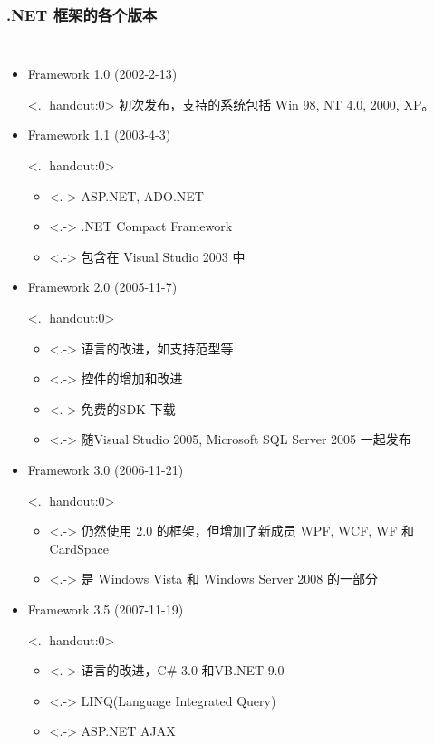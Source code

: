 \begin{frame}
\frametitle{.NET 框架的各个版本}

\begin{columns}[t]
\begin{itemize}[<+->]
\small
\item Framework 1.0 (2002-2-13)

\only<.| handout:0>{ \CJKindent 初次发布，支持的系统包括 Win 98, NT 4.0, 2000, XP。}

\item Framework 1.1 (2003-4-3)

\only<.| handout:0>{
\begin{itemize}
\item<.-> ASP.NET, ADO.NET
\item<.-> .NET Compact Framework
\item<.-> 包含在 Visual Studio 2003 中
\end{itemize}}

\item Framework 2.0 (2005-11-7)

\only<.| handout:0>{
\begin{itemize}
\item<.-> 语言的改进，如支持范型等
\item<.-> 控件的增加和改进
\item<.-> 免费的SDK 下载
\item<.-> 随Visual Studio 2005, Microsoft SQL Server 2005 一起发布
\end{itemize}}

\item Framework 3.0 (2006-11-21)

\only<.| handout:0>{
\begin{itemize}
\item<.-> 仍然使用 2.0 的框架，但增加了新成员 WPF, WCF, WF 和 CardSpace
\item<.-> 是 Windows Vista 和 Windows Server 2008 的一部分
\end{itemize}}

\item Framework 3.5 (2007-11-19)

\only<.| handout:0>{
\begin{itemize}
\item<.-> 语言的改进，C\# 3.0 和VB.NET 9.0
\item<.-> LINQ(Language Integrated Query)
\item<.-> ASP.NET AJAX
\end{itemize}}


\end{itemize}
\end{columns}
\end{frame}
